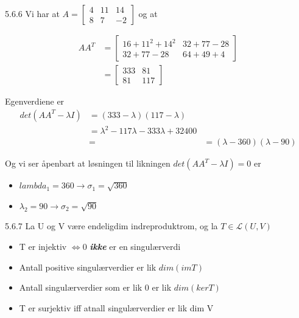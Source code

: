 \documentclass[a4paper,norsk]{article}
\begin{document}
\begin{oppgavebox}{5.6.6}{}
Vi har at $ A = \begin{bmatrix}
    4&11&14\\
    8&7&-2
\end{bmatrix}  $ og at 

\begin{align*}
    AA^T &= \begin{bmatrix}
        16 + 11^2 + 14^2 & 32 + 77 - 28\\
        32 + 77 - 28 & 64 + 49 + 4
    \end{bmatrix} \\
    &= \begin{bmatrix}
        333 & 81\\
        81& 117
    \end{bmatrix} 
\end{align*}

Egenverdiene er
\begin{align*}
    det \left( AA^T - \lambda I \right) &= \left( 333- \lambda  \right) \left( 117 - \lambda  \right) \\
    &= \lambda^2 - 117 \lambda - 333 \lambda  + 32400 \\&=
    &= \left( \lambda - 360 \right) \left( \lambda  - 90 \right) 
\end{align*}

Og vi ser åpenbart at løsningen til likningen $ det \left( AA^T - \lambda I \right) = 0  $ er
\begin{itemize}
    \item $ lambda_1 = 360  \rightarrow \sigma_1 = \sqrt{ 360 }$
    \item $ \lambda _2 = 90 \rightarrow \sigma_2 = \sqrt{ 90 } $  
\end{itemize} 
\end{oppgavebox}


\begin{propositionbox}{5.6.7}{}
    La U og V være endeligdim indreproduktrom, og la $ T \in \mathcal{L}(U, V) $
    \begin{itemize}
        \item T er injektiv $\iff 0$ \textbf{\textit{ikke}} er en singulærverdi
        \item Antall positive singulærverdier er lik $ dim \left( imT \right)  $ 
        \item Antall singulærverdier som er lik 0 er lik $ dim \left( kerT \right)  $ 
        \item T er surjektiv iff atnall singulærverdier er lik dim V
    \end{itemize} 
\end{propositionbox}
\end{document}
